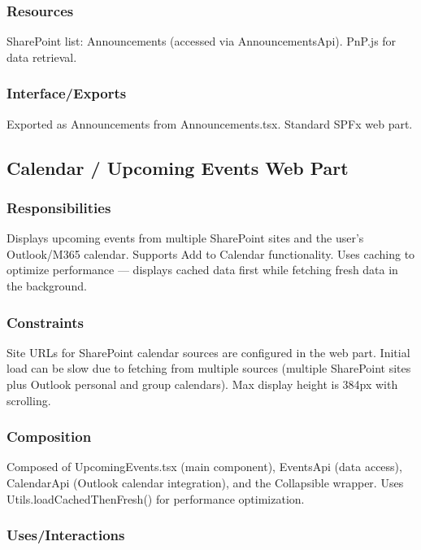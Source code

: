 \documentclass[12pt]{article}
\begin{document}
\subsubsection{Resources}

SharePoint list: Announcements (accessed via AnnouncementsApi). PnP.js for data retrieval.

\subsubsection{Interface/Exports}

Exported as Announcements from Announcements.tsx. Standard SPFx web part.

\subsection{Calendar / Upcoming Events Web Part}

\subsubsection{Responsibilities}

Displays upcoming events from multiple SharePoint sites and the user's Outlook/M365 calendar. Supports Add to Calendar functionality. Uses caching to optimize performance --- displays cached data first while fetching fresh data in the background.

\subsubsection{Constraints}

Site URLs for SharePoint calendar sources are configured in the web part. Initial load can be slow due to fetching from multiple sources (multiple SharePoint sites plus Outlook personal and group calendars). Max display height is 384px with scrolling.

\subsubsection{Composition}

Composed of UpcomingEvents.tsx (main component), EventsApi (data access), CalendarApi (Outlook calendar integration), and the Collapsible wrapper. Uses Utils.loadCachedThenFresh() for performance optimization.

\subsubsection{Uses/Interactions}
\end{document}
